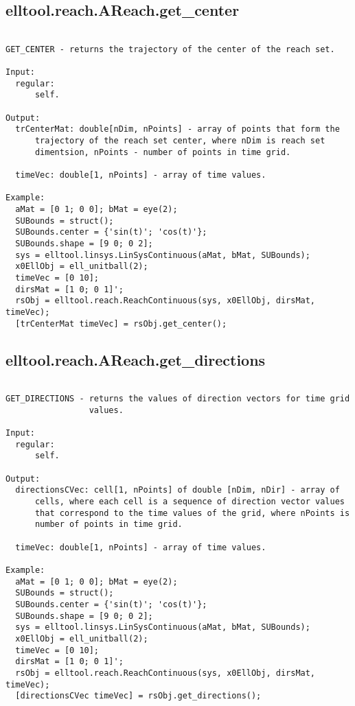 \subsection{\texorpdfstring{elltool.reach.AReach.get\_center}{get\_center}}\label{method:elltool.reach.AReach.getcenter}
\begin{verbatim}

GET_CENTER - returns the trajectory of the center of the reach set.

Input:
  regular:
      self.

Output:
  trCenterMat: double[nDim, nPoints] - array of points that form the
      trajectory of the reach set center, where nDim is reach set
      dimentsion, nPoints - number of points in time grid.

  timeVec: double[1, nPoints] - array of time values.

Example:
  aMat = [0 1; 0 0]; bMat = eye(2);
  SUBounds = struct();
  SUBounds.center = {'sin(t)'; 'cos(t)'};
  SUBounds.shape = [9 0; 0 2];
  sys = elltool.linsys.LinSysContinuous(aMat, bMat, SUBounds);
  x0EllObj = ell_unitball(2);
  timeVec = [0 10];
  dirsMat = [1 0; 0 1]';
  rsObj = elltool.reach.ReachContinuous(sys, x0EllObj, dirsMat, timeVec);
  [trCenterMat timeVec] = rsObj.get_center();
\end{verbatim}
\subsection{\texorpdfstring{elltool.reach.AReach.get\_directions}{get\_directions}}\label{method:elltool.reach.AReach.getdirections}
\begin{verbatim}

GET_DIRECTIONS - returns the values of direction vectors for time grid
                 values.

Input:
  regular:
      self.

Output:
  directionsCVec: cell[1, nPoints] of double [nDim, nDir] - array of
      cells, where each cell is a sequence of direction vector values
      that correspond to the time values of the grid, where nPoints is
      number of points in time grid.

  timeVec: double[1, nPoints] - array of time values.

Example:
  aMat = [0 1; 0 0]; bMat = eye(2);
  SUBounds = struct();
  SUBounds.center = {'sin(t)'; 'cos(t)'};
  SUBounds.shape = [9 0; 0 2];
  sys = elltool.linsys.LinSysContinuous(aMat, bMat, SUBounds);
  x0EllObj = ell_unitball(2);
  timeVec = [0 10];
  dirsMat = [1 0; 0 1]';
  rsObj = elltool.reach.ReachContinuous(sys, x0EllObj, dirsMat, timeVec);
  [directionsCVec timeVec] = rsObj.get_directions();
\end{verbatim}
